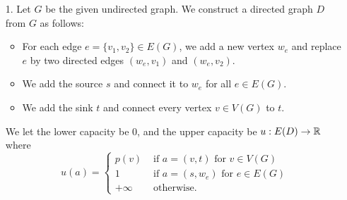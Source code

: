 \documentclass[12pt]{article}
\begin{document}
\begin{enumerate}
%
%
%
%
%

\begin{itemize}
\item[1.] Let $G$ be the given undirected graph. We construct a directed graph $D$ from $G$ as follows:
\begin{itemize}
\item For each edge $e = \{v_1, v_2\} \in E(G)$, we add a new vertex $w_e$ and replace $e$ by two directed edges $(w_e, v_1)$ and $(w_e, v_2)$.
\item We add the source $s$ and connect it to $w_e$ for all $e \in E(G)$.
\item We add the sink $t$ and connect every vertex $v \in V(G)$ to $t$.
\end{itemize}

We let the lower capacity be 0, and the upper capacity be $u : E(D) \to {\mathbb R}$ where
$$
u(a) = \begin{cases}
p(v) & \text{ if $a = (v, t)$ for $v \in V(G)$} \\
1 & \text{ if $a = (s, w_e)$ for $e \in E(G)$} \\
+\infty & \text{ otherwise.}
\end{cases}
$$


\end{itemize}
\end{enumerate}
\end{document}
